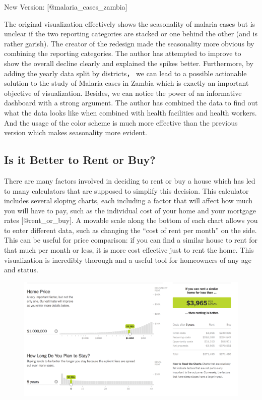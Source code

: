 \documentclass[]{book}
\theoremstyle{definition}
\theoremstyle{definition}
\theoremstyle{definition}
\theoremstyle{remark}
\begin{document}
New Version: {[}@malaria\_cases\_zambia{]}

The original visualization effectively shows the seasonality of malaria
cases but is unclear if the two reporting categories are stacked or one
behind the other (and is rather garish). The creator of the redesign
made the seasonality more obvious by combining the reporting categories.
The author has attempted to improve to show the overall decline clearly
and explained the spikes better. Furthermore, by adding the yearly data
split by districts， we can lead to a possible actionable solution to
the study of Malaria cases in Zambia which is exactly an important
objective of visualization. Besides, we can notice the power of an
informative dashboard with a strong argument. The author has combined
the data to find out what the data looks like when combined with health
facilities and health workers. And the usage of the color scheme is much
more effective than the previous version which makes seasonality more
evident.

\subsection{Is it Better to Rent or
Buy?}\label{is-it-better-to-rent-or-buy}

There are many factors involved in deciding to rent or buy a house which
has led to many calculators that are supposed to simplify this decision.
This calculator includes several sloping charts, each including a factor
that will affect how much you will have to pay, such as the individual
cost of your home and your mortgage rates {[}@rent\_or\_buy{]}. A
movable scale along the bottom of each chart allows you to enter
different data, such as changing the ``cost of rent per month'' on the
side. This can be useful for price comparison: if you can find a similar
house to rent for that much per month or less, it is more cost effective
just to rent the home. This visualization is incredibly thorough and a
useful tool for homeowners of any age and status.

\begin{figure}
\centering
\includegraphics{images/rentcalc.png}
\caption{}
\end{figure}
\end{document}
